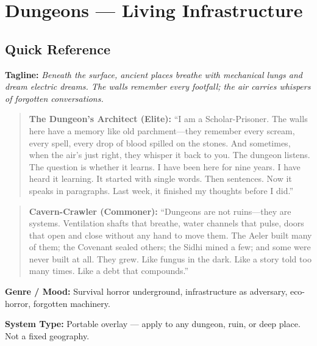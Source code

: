 \section{Dungeons --- Living Infrastructure}
\label{chap:dungeons}

\subsection*{Quick Reference}

\textbf{Tagline:} \textit{Beneath the surface, ancient places breathe with mechanical lungs and dream electric dreams. The walls remember every footfall; the air carries whispers of forgotten conversations.}

\begin{quote}
  \textbf{The Dungeon's Architect (Elite):}  
  ``I am a Scholar-Prisoner. The walls here have a memory like old parchment---they remember every scream, every spell, every drop of blood spilled on the stones. And sometimes, when the air's just right, they whisper it back to you. The dungeon listens. The question is whether it learns. I have been here for nine years. I have heard it learning. It started with single words. Then sentences. Now it speaks in paragraphs. Last week, it finished my thoughts before I did.''
\end{quote}

\begin{quote}
  \textbf{Cavern-Crawler (Commoner):}  
  ``Dungeons are not ruins---they are systems. Ventilation shafts that breathe, water channels that pulse, doors that open and close without any hand to move them. The Aeler built many of them; the Covenant sealed others; the Sidhi mined a few; and some were never built at all. They grew. Like fungus in the dark. Like a story told too many times. Like a debt that compounds.''
\end{quote}

\noindent\textbf{Genre / Mood:} Survival horror underground, infrastructure as adversary, eco-horror, forgotten machinery.

\noindent\textbf{System Type:} Portable overlay --- apply to any dungeon, ruin, or deep place. Not a fixed geography.

